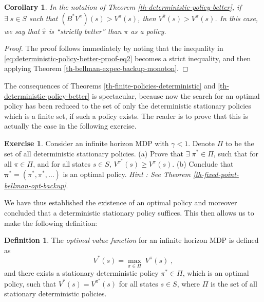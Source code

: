 \documentclass{article}
\newtheorem{corollary}{Corollary}[theorem]
\theoremstyle{definition}
\newtheorem{exercise}{Exercise}[section]
\newtheorem{definition}{Definition}[section]
\theoremstyle{remark}
\begin{document}
\begin{corollary}
In the notation of Theorem \ref{th-deterministic-policy-better}, if $\exists \; s \in S$ such that $(B^{\ast}V^{\pi})(s) > V^{\pi}(s)$, then $V^{\hat{\pi}}(s) > V^{\pi}(s)$. In this case, we say that $\hat{\pi}$ is \textit{``strictly better''} than $\pi$ as a policy.
\label{cor-strictly-better-policy}
\end{corollary}

\begin{proof}
The proof follows immediately by noting that the inequality in \eqref{eq:deterministic-policy-better-proof-eq2} becomes a strict inequality, and then applying Theorem \ref{th-bellman-expec-backup-monoton}.
\end{proof}

The consequences of Theorems \ref{th-finite-policies-deterministic} and \ref{th-deterministic-policy-better} is spectacular, because now the search for an optimal policy has been reduced to the set of only the deterministic stationary policies which is a finite set, if such a policy exists. The reader is to prove that this is actually the case in the following exercise.

\begin{exercise}
Consider an infinite horizon MDP with $\gamma < 1$. Denote $\Pi$ to be the set of all deterministic stationary policies. (a) Prove that $\exists \; \pi^{\ast} \in \Pi$, such that for all $\pi \in \Pi$, and for all states $s \in S$, $V^{\pi^{\ast}}(s) \geq V^{\pi}(s)$. (b) Conclude that $\bm{\pi^{\ast}} = (\pi^{\ast}, \pi^{\ast}, \dots)$ is an optimal policy. \textit{Hint : See Theorem \ref{th-fixed-point-bellman-opt-backup}}.
\label{ex-opt-policy-existence}
\end{exercise}

We have thus established the existence of an optimal policy and moreover concluded that a deterministic stationary policy suffices. This then allows us to make the following definition:

\begin{definition}
The \textit{optimal value function} for an infinite horizon MDP is defined as
\begin{equation}
V^{\ast}(s) = \underset{\pi \in \Pi}{\max} \; V^{\pi}(s) \;,
\label{eq:opt-valfunc-mdp-infinite}
\end{equation}
and there exists a stationary deterministic policy $\pi^{\ast} \in \Pi$, which is an optimal policy, such that $V^{\ast}(s) = V^{\pi^{\ast}}(s)$ for all states $s \in S$, where $\Pi$ is the set of all stationary deterministic policies.
\label{def-opt-valfunc-mdp-infinite}
\end{definition}
\end{document}
